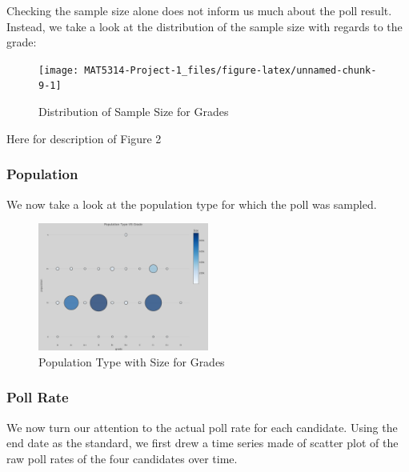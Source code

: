 \documentclass[
  12pt,
]{article}
\begin{document}
Checking the sample size alone does not inform us much about the poll
result. Instead, we take a look at the distribution of the sample size
with regards to the grade:

\begin{minipage}[t]{0.5\textwidth}
\begin{figure}
\texttt{[image: MAT5314-Project-1\_files/figure-latex/unnamed-chunk-9-1]} \caption{Distribution of Sample Size for Grades}\label{fig:unnamed-chunk-9}
\end{figure}
\end{minipage}
\begin{minipage}[t]{0.5\textwidth}
\vspace{0pt}
Here for description of Figure 2
\end{minipage}

\hypertarget{population}{%
\subsubsection{Population}\label{population}}

We now take a look at the population type for which the poll was
sampled.

\begin{figure}
\centering
\includegraphics[width=0.5\textwidth,height=\textheight]{./Figures/popChart.png}
\caption{Population Type with Size for Grades}
\end{figure}

\hypertarget{poll-rate}{%
\subsubsection{Poll Rate}\label{poll-rate}}

We now turn our attention to the actual poll rate for each candidate.
Using the end date as the standard, we first drew a time series made of
scatter plot of the raw poll rates of the four candidates over time.
\end{document}
